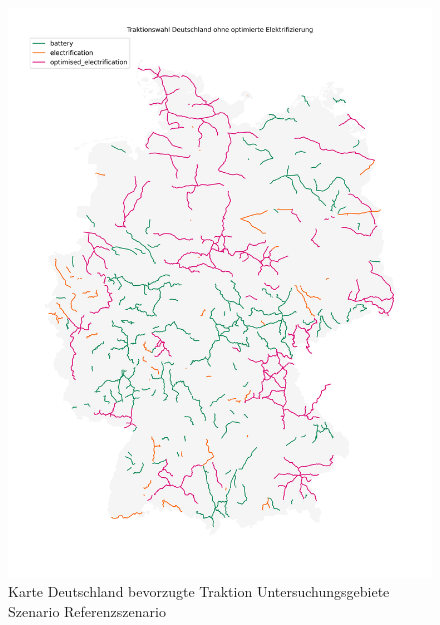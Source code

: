\begin{center}
	\begin{figure}[p]
	\includegraphics[height=0.8\textheight]{../report_scenarios/s_1/files/deutschland_map}
	\caption{\label{fig_s_1_d_map} Karte Deutschland bevorzugte Traktion Untersuchungsgebiete Szenario Referenzszenario}
	\end{figure}
\end{center}

